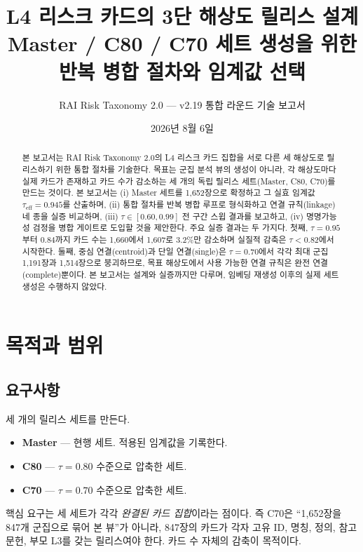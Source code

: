 \documentclass[11pt,a4paper]{article}
\title{\textbf{L4 리스크 카드의 3단 해상도 릴리스 설계}\\[4pt]
\large Master / C80 / C70 세트 생성을 위한 반복 병합 절차와 임계값 선택}
\author{RAI Risk Taxonomy 2.0 --- v2.19 통합 라운드 기술 보고서}
\date{2026년 8월 6일}
\begin{document}
\maketitle

\begin{abstract}
본 보고서는 RAI Risk Taxonomy 2.0의 L4 리스크 카드 집합을 서로 다른 세 해상도로 릴리스하기 위한 통합 절차를 기술한다. 목표는 군집 분석 뷰의 생성이 아니라, 각 해상도마다 실제 카드가 존재하고 카드 수가 감소하는 세 개의 독립 릴리스 세트(Master, C80, C70)를 만드는 것이다. 본 보고서는 (i) Master 세트를 1{,}652장으로 확정하고 그 실효 임계값 $\tau_{\mathrm{eff}}=0.945$를 산출하며, (ii) 통합 절차를 반복 병합 루프로 형식화하고 연결 규칙(linkage) 네 종을 실증 비교하며, (iii) $\tau \in [0.60, 0.99]$ 전 구간 스윕 결과를 보고하고, (iv) 명명가능성 검정을 병합 게이트로 도입할 것을 제안한다. 주요 실증 결과는 두 가지다. 첫째, $\tau=0.95$부터 $0.84$까지 카드 수는 1{,}660에서 1{,}607로 3.2\%만 감소하며 실질적 감축은 $\tau<0.82$에서 시작한다. 둘째, 중심 연결(centroid)과 단일 연결(single)은 $\tau=0.70$에서 각각 최대 군집 1{,}191장과 1{,}514장으로 붕괴하므로, 목표 해상도에서 사용 가능한 연결 규칙은 완전 연결(complete)뿐이다. 본 보고서는 설계와 실증까지만 다루며, 임베딩 재생성 이후의 실제 세트 생성은 수행하지 않았다.
\end{abstract}

\section{목적과 범위}

\subsection{요구사항}

세 개의 릴리스 세트를 만든다.

\begin{itemize}[leftmargin=1.6em,itemsep=2pt]
  \item \textbf{Master} --- 현행 세트. 적용된 임계값을 기록한다.
  \item \textbf{C80} --- $\tau=0.80$ 수준으로 압축한 세트.
  \item \textbf{C70} --- $\tau=0.70$ 수준으로 압축한 세트.
\end{itemize}

핵심 요구는 세 세트가 각각 \emph{완결된 카드 집합}이라는 점이다. 즉 C70은 ``1{,}652장을 847개 군집으로 묶어 본 뷰''가 아니라, 847장의 카드가 각자 고유 ID, 명칭, 정의, 참고문헌, 부모 L3를 갖는 릴리스여야 한다. 카드 수 자체의 감축이 목적이다.
\end{document}
